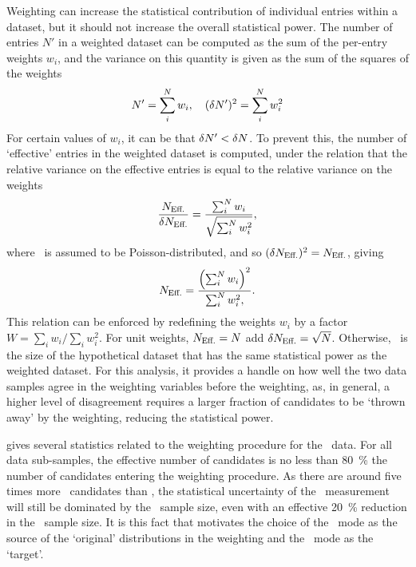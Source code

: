 Weighting can increase the statistical contribution of individual entries 
within a dataset, but it should not increase the overall statistical power.
The number of entries $N'$ in a weighted dataset can be computed as the sum of 
the per-entry weights $w_{i}$, and the variance on this quantity is given as 
the sum of the squares of the weights
\begin{equation}
  N' = \sum_{i}^{N} w_{i},\quad (\delta{N'})^{2} = \sum_{i}^{N} w_{i}^{2}
\end{equation}
For certain values of $w_{i}$, it can be that $\delta{N'} < \delta{N}$.
To prevent this, the number of `effective' entries in the weighted dataset is 
computed, under the relation that the relative variance on the effective 
entries is equal to the relative variance on the weights
\begin{equation}
  \frac{N_{\text{Eff.}}}{\delta{\ensuremath{N_{\text{Eff.}}}}} =
    \frac{\sum_{i}^{N} w_{i}}{\sqrt{\sum_{i}^{N} w_{i}^{2}}},
\end{equation}
where \neff\ is assumed to be Poisson-distributed, and so $(\delta{\ensuremath{N_{\text{Eff.}}}})^{2} = 
N_{\text{Eff.}}$, giving
\begin{equation}
  \neff = \frac{%
    {\left(\sum_{i}^{N}{w_{i}}\right)}^{2}
  }{%
    \sum_{i}^{N}{w_{i}^{2}},
  }.
  \label{eqn:cpv:kinematic_weighting:neff}
\end{equation}
This relation can be enforced by redefining the weights $w_{i}$ by a factor $W 
= \sum_{i} w_{i}/\sum_{i} w_{i}^{2}$.
For unit weights, $N_{\text{Eff.}} = N$ add $\delta{\ensuremath{N_{\text{Eff.}}}} = \sqrt{N}$.
Otherwise, \neff\ is the size of the hypothetical dataset that has the same 
statistical power as the weighted dataset.
For this analysis, it provides a handle on how well the two data samples agree 
in the weighting variables before the weighting, as, in general, a higher level 
of disagreement requires a larger fraction of candidates to be `thrown away' by 
the weighting, reducing the statistical power.

 gives several statistics 
related to the weighting procedure for the \ppipi\ data.
For all data sub-samples, the effective number of candidates is no less than 
\SI{80}{\percent} the number of candidates entering the weighting procedure.
As there are around five times more \ppipi\ candidates than \pKK, the 
statistical uncertainty of the \dACP\ measurement will still be dominated by 
the \pKK\ sample size, even with an effective \SI{20}{\percent} reduction in 
the \ppipi\ sample size.
It is this fact that motivates the choice of the \ppipi\ mode as the source of 
the `original' distributions in the weighting and the \pKK\ mode as the 
`target'.

